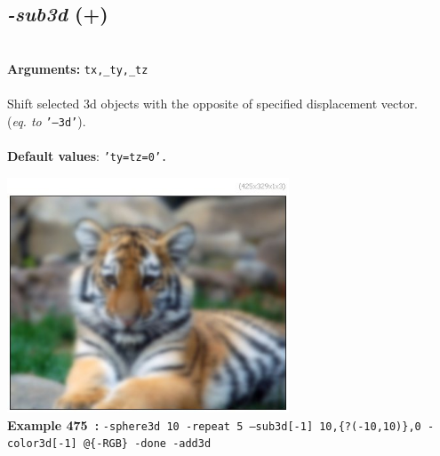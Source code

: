 \documentclass[a4paper,11pt,twoside]{book}
\begin{document}
\subsection{\emph{-sub3d} (+)}\vspace*{-0.5em}
~\\\textbf{Arguments: } 
{\small \texttt{tx,\_ty,\_tz}}\\~\\
Shift selected 3d objects with the opposite of specified displacement vector.
~\\(\emph{eq. to} {\small \texttt{'--3d'}}).
~\\~\\\textbf{Default values}: {\small \texttt{'ty=tz=0'.}}
\begin{center}\includegraphics[keepaspectratio=true,height=7cm,width=\textwidth]{img/gmic_def475.jpg}\\
{\footnotesize \textbf{Example 475~:} \texttt{-sphere3d 10 -repeat 5 --sub3d[-1] 10,\{?(-10,10)\},0 -color3d[-1] @\{-RGB\} -done -add3d}}
\end{center}
\end{document}
